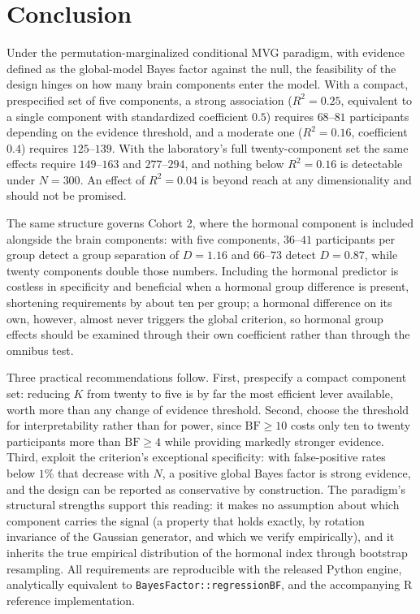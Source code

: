 \documentclass[11pt,a4paper]{article}
\newcommand{\BF}{\mathrm{BF}}
\begin{document}
\section{Conclusion}

Under the permutation-marginalized conditional MVG paradigm, with evidence defined as the global-model Bayes factor against the null, the feasibility of the design hinges on how many brain components enter the model. With a compact, prespecified set of five components, a strong association ($R^{2}=0.25$, equivalent to a single component with standardized coefficient $0.5$) requires $68$--$81$ participants depending on the evidence threshold, and a moderate one ($R^{2}=0.16$, coefficient $0.4$) requires $125$--$139$. With the laboratory's full twenty-component set the same effects require $149$--$163$ and $277$--$294$, and nothing below $R^{2}=0.16$ is detectable under $N=300$. An effect of $R^{2}=0.04$ is beyond reach at any dimensionality and should not be promised.

The same structure governs Cohort 2, where the hormonal component is included alongside the brain components: with five components, $36$--$41$ participants per group detect a group separation of $D=1.16$ and $66$--$73$ detect $D=0.87$, while twenty components double those numbers. Including the hormonal predictor is costless in specificity and beneficial when a hormonal group difference is present, shortening requirements by about ten per group; a hormonal difference on its own, however, almost never triggers the global criterion, so hormonal group effects should be examined through their own coefficient rather than through the omnibus test.

Three practical recommendations follow. First, prespecify a compact component set: reducing $K$ from twenty to five is by far the most efficient lever available, worth more than any change of evidence threshold. Second, choose the threshold for interpretability rather than for power, since $\BF\ge10$ costs only ten to twenty participants more than $\BF\ge4$ while providing markedly stronger evidence. Third, exploit the criterion's exceptional specificity: with false-positive rates below $1\%$ that decrease with $N$, a positive global Bayes factor is strong evidence, and the design can be reported as conservative by construction. The paradigm's structural strengths support this reading: it makes no assumption about which component carries the signal (a property that holds exactly, by rotation invariance of the Gaussian generator, and which we verify empirically), and it inherits the true empirical distribution of the hormonal index through bootstrap resampling. All requirements are reproducible with the released Python engine, analytically equivalent to \texttt{BayesFactor::regressionBF}, and the accompanying R reference implementation.
\end{document}
